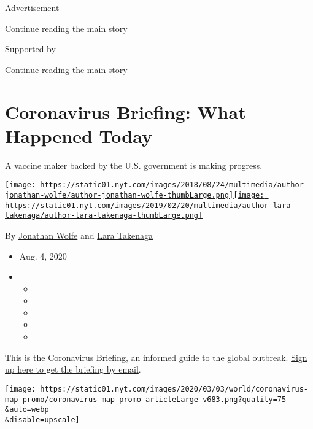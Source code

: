 Advertisement

\protect\hyperlink{after-top}{Continue reading the main story}

Supported by

\protect\hyperlink{after-sponsor}{Continue reading the main story}

\hypertarget{coronavirus-briefing-what-happened-today}{%
\section{Coronavirus Briefing: What Happened
Today}\label{coronavirus-briefing-what-happened-today}}

A vaccine maker backed by the U.S. government is making progress.

\href{https://www.nytimes.com/by/jonathan-wolfe}{\texttt{[image: https://static01.nyt.com/images/2018/08/24/multimedia/author-jonathan-wolfe/author-jonathan-wolfe-thumbLarge.png]}}\href{https://www.nytimes.com/by/lara-takenaga}{\texttt{[image: https://static01.nyt.com/images/2019/02/20/multimedia/author-lara-takenaga/author-lara-takenaga-thumbLarge.png]}}

By \href{https://www.nytimes.com/by/jonathan-wolfe}{Jonathan Wolfe} and
\href{https://www.nytimes.com/by/lara-takenaga}{Lara Takenaga}

\begin{itemize}
\item
  Aug. 4, 2020
\item
  \begin{itemize}
  \item
  \item
  \item
  \item
  \item
  \end{itemize}
\end{itemize}

This is the Coronavirus Briefing, an informed guide to the global
outbreak.
\href{https://www.nytimes.com/newsletters/coronavirus-briefing}{Sign up
here to get the briefing by email}.

\texttt{[image: https://static01.nyt.com/images/2020/03/03/world/coronavirus-map-promo/coronavirus-map-promo-articleLarge-v683.png?quality=75\\\&auto=webp\\\&disable=upscale]}

